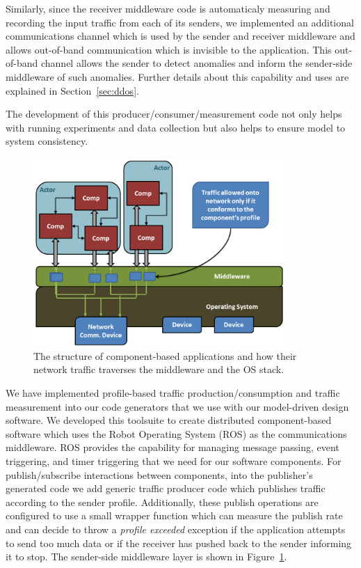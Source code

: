 Similarly, since the receiver middleware code is automaticaly
measuring and recording the input traffic from each of its senders, we
implemented an additional communications channel which is used by the
sender and receiver middleware and allows out-of-band communication
which is invisible to the application.  This out-of-band channel
allows the sender to detect anomalies and inform the sender-side
middleware of such anomalies.  Further details about this capability
and uses are explained in Section~\ref{sec:ddos}.

The development of this producer/consumer/measurement code not only
helps with running experiments and data collection but also helps to
ensure model to system consistency.
  
\begin{figure}[ht!]
  \centering
  \includegraphics[width=0.85\textwidth]{../doc/src/images/results/app_layers.png}
  \caption{The structure of component-based applications and how their network
   traffic traverses the middleware and the OS stack.}
  \label{fig:sender}
\end{figure}

We have implemented profile-based traffic production/consumption and
traffic measurement into our code generators that we use with our
model-driven design software.  We developed this toolsuite to create
distributed component-based software which uses the Robot Operating
System (ROS)\cite{ros} as the communications middleware.  ROS provides
the capability for managing message passing, event triggering, and
timer triggering that we need for our software components.  For
publish/subscribe interactions between components, into the
publisher's generated code we add generic traffic producer code which
publishes traffic according to the sender profile.  Additionally,
these publish operations are configured to use a small wrapper
function which can measure the publish rate and can decide to throw a
\emph{profile exceeded} exception if the application attempts to send
too much data or if the receiver has pushed back to the sender
informing it to stop.  The sender-side middleware layer is shown in
Figure~\ref{fig:sender}.

